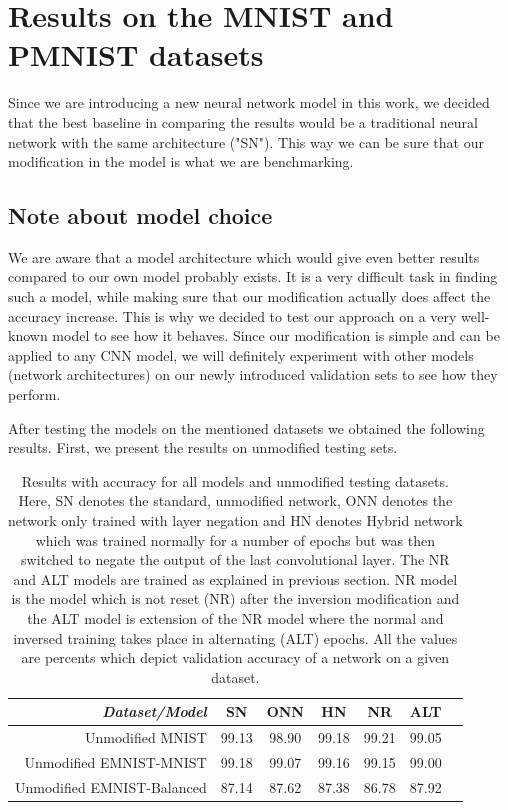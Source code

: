 \documentclass[b5paper]{book}
\begin{document}
\section{Results on the MNIST and PMNIST datasets}

Since we are introducing a new neural network model in this work, we decided that the best baseline in comparing the results would be a traditional neural network with the same architecture ("SN"). This way we can be sure that our modification in the model is what we are benchmarking.

\subsection{Note about model choice} \label{modelchoice}

We are aware that a model architecture which would give even better results compared to our own model probably exists. It is a very difficult task in finding such a model, while making sure that our modification actually does affect the accuracy increase. This is why we decided to test our approach on a very well-known model to see how it behaves. Since our modification is simple and can be applied to any CNN model, we will definitely experiment with other models (network architectures) on our newly introduced validation sets to see how they perform.

After testing the models on the mentioned datasets we obtained the following results. First, we present the results on unmodified testing sets.

\begin{table}[ht]
  \centering
  \begin{tabular}{rS[table-format=2.1]S[table-format=2.1]S[table-format=2.1]S[table-format=2.1]S[table-format=2.1]S[table-format=2.1]}
    \toprule
     \textit{Dataset/Model} & SN & ONN & HN & NR & ALT \\
    \midrule
    {Unmodified MNIST} & {99.13} & {98.90} & {99.18} & {99.21} & {99.05} \\
    {Unmodified EMNIST-MNIST} & {99.18} & {99.07} & {99.16} & {99.15} & {99.00} \\
    {Unmodified EMNIST-Balanced} & {87.14} & {87.62} & {87.38} & {86.78} & {87.92} \\
    
    \bottomrule
  \end{tabular}
  \caption{Results with accuracy for all models and unmodified testing datasets. Here, SN denotes the standard, unmodified network, ONN denotes the network only trained with layer negation and HN denotes Hybrid network which was trained normally for a number of epochs but was then switched to negate the output of the last convolutional layer. The NR and ALT models are trained as explained in previous section. NR model is the model which is not reset (NR) after the inversion modification and the ALT model is extension of the NR model where the normal and inversed training takes place in alternating (ALT) epochs. All the values are percents which depict validation accuracy of a network on a given dataset.}
  \label{tab:results-unmodified}
\end{table} 
\end{document}
